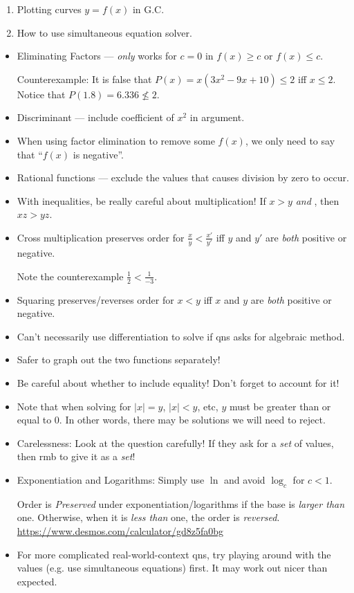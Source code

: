 \documentclass[oneside]{book}
\begin{document}
\begin{GCSkills}{}
  \begin{enumerate}
    \item Plotting curves \(y=f(x)\) in G.C.
    \item How to use simultaneous equation solver.
  \end{enumerate}
\end{GCSkills}
\begin{IN}
  \begin{itemize}
    \item Eliminating Factors --- \emph{only} works for \(c=0\) in \(f(x) \geq c\) or \(f(x) \leq c\).

    Counterexample: It is false that \(P(x)=x(3x^2-9x+10) \leq 2\) iff \(x \leq 2\). Notice that \(P(1.8)=6.336 \not\leq 2\). 
    \item Discriminant --- include coefficient of \(x^2\) in argument.
    \item When using factor elimination to remove some \(f(x)\), we only need to say that ``\(f(x)\) is negative''.
    \item Rational functions --- exclude the values that causes division by zero to occur.
    \item With inequalities, be really careful about multiplication! If \(x>y\) \emph{and} , then \(xz>yz\). 
    \item Cross multiplication preserves order for \(\frac{x}{y}<\frac{x'}{y'}\) iff \(y\) and \(y'\) are \emph{both} positive or negative.
    
    Note the counterexample \(\frac{1}{2}<\frac{1}{-3}\).
    \item Squaring preserves/reverses order for \(x<y\) iff \(x\) and \(y\) are \emph{both} positive or negative.
    \item Can't necessarily use differentiation to solve if qns asks for algebraic method.
    \item Safer to graph out the two functions separately!
    \item Be careful about whether to include equality! Don't forget to account for it!
    \item  Note that when solving for \(\lvert x \rvert=y\), \(\lvert x \rvert < y\), etc, \(y\) must be greater than or equal to 0. In other words, there may be solutions we will need to reject.
    \item Carelessness: Look at the question carefully! If they ask for a \emph{set} of values, then rmb to give it as a \emph{set}!
    \item Exponentiation and Logarithms: Simply use \(\ln\) and avoid \(\log_c\) for \(c<1\).
    
    Order is \emph{Preserved} under exponentiation/logarithms if the base is \emph{larger than} one. Otherwise, when it is \emph{less than} one, the order is \emph{reversed}. \url{https://www.desmos.com/calculator/gd8z5fa0bg}
    \item  For more complicated real-world-context qns, try playing around with the values (e.g. use simultaneous equations) first. It may work out nicer than expected.
\end{itemize}
\end{IN}
\end{document}
